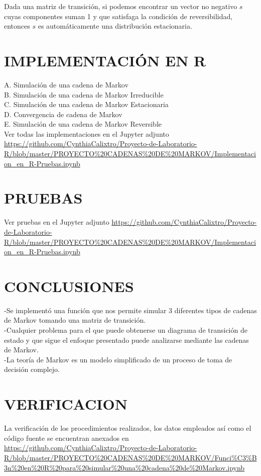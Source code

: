 \documentclass[10pt,a4paper]{article}
\theoremstyle{definition}
\theoremstyle{remark}
\begin{document}
\begin{multicols}{2}
Dada una matriz de transición, si podemos encontrar un vector no negativo $s$ cuyas componentes suman 1 y que satisfaga la condición de reversibilidad, entonces $s$ es automáticamente una distribución estacionaria.


\section{IMPLEMENTACIÓN EN R}
\noindent
{A. Simulación de una cadena de Markov}\\
{B. Simulación de una cadena de Markov Irreducible}\\
{C. Simulación de una cadena de Markov Estacionaria}\\
{D. Convergencia de cadena de Markov}\\
{E. Simulación de una cadena de Markov Reversible}\\

 Ver todas las implementaciones en el Jupyter adjunto \url{https://github.com/CynthiaCalixtro/Proyecto-de-Laboratorio-R/blob/master/PROYECTO%20CADENAS%20DE%20MARKOV/Implementacion_en_R-Pruebas.ipynb}
\section{PRUEBAS}
Ver pruebas en el Jupyter adjunto  \url {https://github.com/CynthiaCalixtro/Proyecto-de-Laboratorio-R/blob/master/PROYECTO%20CADENAS%20DE%20MARKOV/Implementacion_en_R-Pruebas.ipynb}
\section{CONCLUSIONES}
\noindent -Se implementó una función que nos permite simular 3 diferentes tipos de cadenas de Markov tomando una matriz de transición.\\
-Cualquier problema para el que puede obtenerse un diagrama de transición de estado y que sigue el enfoque presentado puede analizarse mediante las cadenas de Markov. \\
-La teoría de Markov es un modelo simplificado de un proceso de toma de decisión complejo. 
\section{VERIFICACION}
La verificación de los procedimientos realizados, los datos empleados así como el código fuente se encuentran anexados en \url{https://github.com/CynthiaCalixtro/Proyecto-de-Laboratorio-R/blob/master/PROYECTO%20CADENAS%20DE%20MARKOV/Funci%C3%B3n%20en%20R%20para%20simular%20una%20cadena%20de%20Markov.ipynb}
  
\end{multicols}
\end{document}
